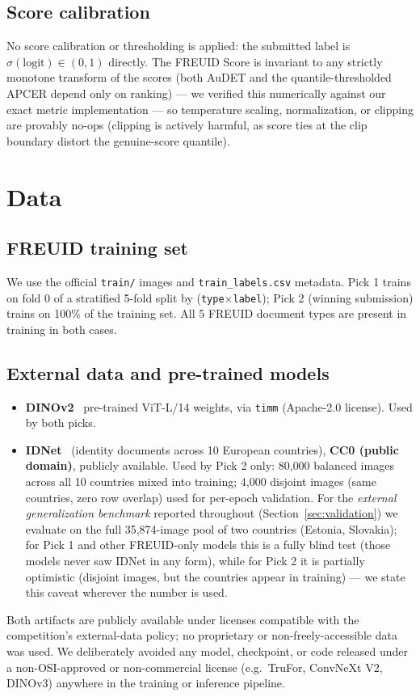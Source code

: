 \documentclass[11pt,a4paper]{article}
\begin{document}
\subsection{Score calibration}
\label{sec:calibration}
No score calibration or thresholding is applied: the submitted label is
$\sigma(\text{logit})\in(0,1)$ directly. The FREUID Score is invariant to any
strictly monotone transform of the scores (both AuDET and the
quantile-thresholded APCER depend only on ranking) --- we verified this
numerically against our exact metric implementation --- so temperature scaling,
normalization, or clipping are provably no-ops (clipping is actively harmful, as
score ties at the clip boundary distort the genuine-score quantile).

\section{Data}
\label{sec:data}

\subsection{FREUID training set}
\label{sec:external-data}
We use the official \texttt{train/} images and \texttt{train\_labels.csv}
metadata. Pick 1 trains on fold 0 of a stratified 5-fold split by
(\texttt{type}$\times$\texttt{label}); Pick 2 (winning submission) trains on
100\% of the training set. All 5 FREUID document types are present in
training in both cases.

\subsection{External data and pre-trained models}
\begin{itemize}[noitemsep]
  \item \textbf{DINOv2}~\cite{dinov2} pre-trained ViT-L/14 weights, via
    \texttt{timm} (Apache-2.0 license). Used by both picks.
  \item \textbf{IDNet}~\cite{idnet2024} (identity documents across 10 European
    countries), \textbf{CC0 (public domain)}, publicly available. Used by
    Pick 2 only: 80{,}000 balanced images across all 10 countries mixed into
    training; 4{,}000 disjoint images (same countries, zero row overlap) used
    for per-epoch validation. For the \emph{external generalization
    benchmark} reported throughout (Section~\ref{sec:validation}) we evaluate
    on the full 35{,}874-image pool of two countries (Estonia, Slovakia); for
    Pick 1 and other FREUID-only models this is a fully blind test (those
    models never saw IDNet in any form), while for Pick 2 it is partially
    optimistic (disjoint images, but the countries appear in training) --- we
    state this caveat wherever the number is used.
\end{itemize}
Both artifacts are publicly available under licenses compatible with the
competition's external-data policy; no proprietary or non-freely-accessible data
was used. We deliberately avoided any model, checkpoint, or code released under
a non-OSI-approved or non-commercial license (e.g.\ TruFor, ConvNeXt V2, DINOv3)
anywhere in the training or inference pipeline.
\end{document}
